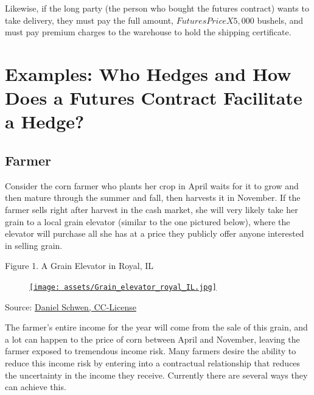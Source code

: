 \documentclass[
  letterpaper,
  DIV=11,
  numbers=noendperiod]{scrreprt}
\begin{document}
Likewise, if the long party (the person who bought the futures contract)
wants to take delivery, they must pay the full amount,
\(Futures Price X 5,000\) bushels, and must pay premium charges to the
warehouse to hold the shipping certificate.

\hypertarget{examples-who-hedges-and-how-does-a-futures-contract-facilitate-a-hedge}{%
\section{Examples: Who Hedges and How Does a Futures Contract Facilitate
a
Hedge?}\label{examples-who-hedges-and-how-does-a-futures-contract-facilitate-a-hedge}}

\hypertarget{farmer}{%
\subsection{Farmer}\label{farmer}}

Consider the corn farmer who plants her crop in April waits for it to
grow and then mature through the summer and fall, then harvests it in
November. If the farmer sells right after harvest in the cash market,
she will very likely take her grain to a local grain elevator (similar
to the one pictured below), where the elevator will purchase all she has
at a price they publicly offer anyone interested in selling grain.

Figure 1. A Grain Elevator in Royal, IL

\begin{figure}

{\centering 

\href{https://commons.wikimedia.org/wiki/File:Grain_elevators_in_Royal,_IL.}{\texttt{[image: assets/Grain\_elevator\_royal\_IL.jpg]}}

}

\end{figure}

Source:
\href{https://commons.wikimedia.org/wiki/File\%3AGrain_elevators_in_Royal\%2C_IL.jpg}{Daniel
Schwen, CC-License}

The farmer's entire income for the year will come from the sale of this
grain, and a lot can happen to the price of corn between April and
November, leaving the farmer exposed to tremendous income risk. Many
farmers desire the ability to reduce this income risk by entering into a
contractual relationship that reduces the uncertainty in the income they
receive. Currently there are several ways they can achieve this.
\end{document}
